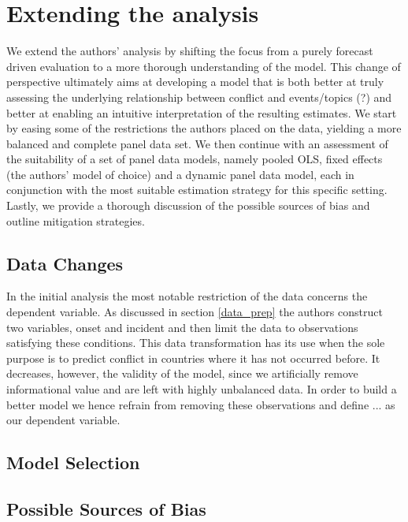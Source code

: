 \section{Extending the analysis}
We extend the authors' analysis by shifting the focus from a purely forecast driven evaluation to a more thorough understanding of the model.
This change of perspective ultimately aims at developing a model that is both better at truly assessing the underlying relationship between conflict
and events/topics (?) and better at enabling an intuitive interpretation of the resulting estimates.
We start by easing some of the restrictions the authors placed on the data, yielding a more balanced and complete panel data set.
We then continue with an assessment of the suitability of a set of panel data models, namely pooled OLS, fixed effects (the authors' model of choice)
and a dynamic panel data model, each in conjunction with the most suitable estimation strategy for this specific setting.
Lastly, we provide a thorough discussion of the possible sources of bias and outline mitigation strategies.

\subsection{Data Changes}
In the initial analysis the most notable restriction of the data concerns the dependent variable.
As discussed in section \ref{data_prep} the authors construct two variables, onset and incident and then limit the data to observations satisfying these conditions.
This data transformation has its use when the sole purpose is to predict conflict in countries where it has not occurred before.
It decreases, however, the validity of the model, since we artificially remove informational value and are left with highly unbalanced data.
In order to build a better model we hence refrain from removing these observations and define ... as our dependent variable.

\subsection{Model Selection}



\subsection{Possible Sources of Bias}


